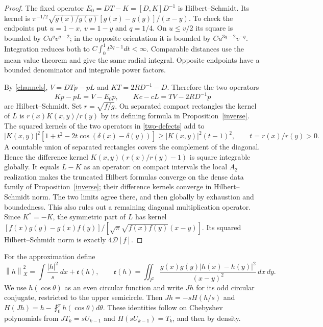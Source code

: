 \documentclass[a4paper,11pt]{amsart}
\theoremstyle{remark}\newtheorem{remark}[theorem]{Remark}
\newcommand{\dd}{\,d}
\newcommand{\norm}[1]{\left\lVert#1\right\rVert}
\begin{document}
\begin{proof}
The fixed operator $E_0=DT-K=[D,K]D^{-1}$ is Hilbert--Schmidt.
Its kernel is
$\pi^{-1/2}\sqrt{g(x)/g(y)}[g(x)-g(y)]/(x-y)$.
To check the endpoints put $u=1-x$, $v=1-y$ and $q=1/4$.
On $u\le v/2$ its square is bounded by $Cu^qv^{q-2}$; in the
opposite orientation it is bounded by $Cu^{3q-2}v^{-q}$.
Integration reduces both to $C\int_0^1t^{2q-1}dt<\infty$.
Comparable distances use the mean value theorem and give the same
radial integral. Opposite endpoints have a bounded denominator
and integrable power factors.

By \eqref{channels}, $V=DTp-pL$ and $KT=2RD^{-1}-D$.
Therefore the two operators
\begin{equation}\label{two-defects}
 Kp-pL=V-E_0p,\qquad
 Kc-cL=TV-2RD^{-1}p
\end{equation}
are Hilbert--Schmidt. Set $r=\sqrt{f/g}$. On separated compact
rectangles the kernel of $L$ is $r(x)K(x,y)/r(y)$ by its defining
formula in Proposition~\ref{inverse}. The squared kernels of the
two operators in \eqref{two-defects} add to
\begin{equation}\label{kernel-lower}
 |K(x,y)|^2[1+t^2-2t\cos(\delta(x)-\delta(y))]
 \ge |K(x,y)|^2(t-1)^2,\qquad t=r(x)/r(y)>0.
\end{equation}
A countable union of separated rectangles covers the complement
of the diagonal. Hence the difference kernel
$K(x,y)(r(x)/r(y)-1)$ is square integrable globally.
It equals $L-K$ as an operator: on compact intervals the local
$A_2$ realization makes the truncated Hilbert formulas converge
on the dense data family of Proposition~\ref{inverse}; their
difference kernels converge in Hilbert--Schmidt norm. The two
limits agree there, and then globally by exhaustion and boundedness.
This also rules out a remaining diagonal multiplication operator.
Since $K^*=-K$, the symmetric part of $L$ has kernel
$[f(x)g(y)-g(x)f(y)]/[\sqrt\pi\sqrt{f(x)f(y)}(x-y)]$.
Its squared Hilbert--Schmidt norm is exactly $4\mathcal D[f]$.
\end{proof}

For the approximation define
\begin{equation}\label{X-space}
 \norm h_X^2=\int\frac{|h|^2}{s}\dd x+\mathfrak e(h),\qquad
 \mathfrak e(h)=\iint_{I^2}
 \frac{g(x)g(y)|h(x)-h(y)|^2}{(x-y)^2}\dd x\dd y.
\end{equation}
We use $h(\cos\theta)$ as an even circular function and write $Jh$
for its odd circular conjugate, restricted to the upper semicircle.
Then $Jh=-sH(h/s)$ and $H(Jh)=h-\fint_0^\pi h(\cos\theta)d\theta$.
These identities follow on Chebyshev polynomials from
$JT_k=sU_{k-1}$ and $H(sU_{k-1})=T_k$, and then by density.
\end{document}
